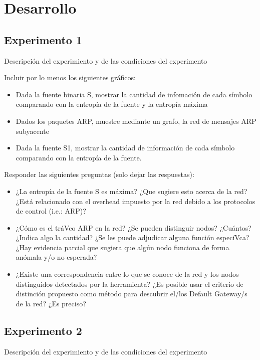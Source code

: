 \section{Desarrollo}

\subsection{Experimento 1}

Descripci\'on del experimiento y de las condiciones del experimento

Incluir por lo menos los siguientes gr\'aficos:

\begin{itemize}
	\item Dada la fuente binaria S, mostrar la cantidad de infomación de cada símbolo comparando con la entropía de la fuente y la entropía máxima
	\item Dados los paquetes ARP, muestre mediante un grafo, la red de mensajes ARP subyacente
	\item Dada la fuente S1, mostrar la cantidad de información de cada símbolo comparando con la entropía de la fuente.
\end{itemize}

Responder las siguientes preguntas (solo dejar las respuestas):

\begin{itemize}
	\item ¿La entropía de la fuente S es máxima? ¿Que sugiere esto acerca de la red? ¿Está relacionado con el overhead impuesto por la red debido a los protocolos de control (i.e.: ARP)?
	\item ¿Cómo es el tráVco ARP en la red? ¿Se pueden distinguir nodos? ¿Cuántos? ¿Indica algo la cantidad? ¿Se les puede adjudicar alguna función especíVca? ¿Hay evidencia parcial que sugiera que algún nodo funciona de forma anómala y/o no esperada?
	\item ¿Existe una correspondencia entre lo que se conoce de la red y los nodos distinguidos detectados por la herramienta? ¿Es posible usar el criterio de distinción propuesto como método para descubrir el/los Default Gateway/s de la red? ¿Es preciso?
\end{itemize}

\subsection{Experimento 2}

Descripci\'on del experimiento y de las condiciones del experimento

